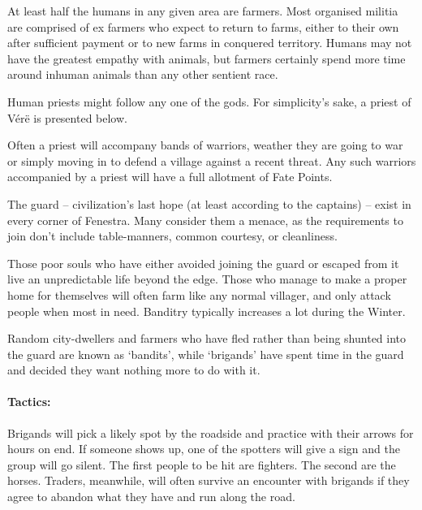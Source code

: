 \begin{multicols}{2}
At least half the humans in any given area are farmers.
Most organised militia are comprised of ex farmers who expect to return to farms, either to their own after sufficient payment or to new farms in conquered territory.
Humans may not have the greatest empathy with animals, but farmers certainly spend more time around inhuman animals than any other sentient race.


\label{human_priest}

Human priests might follow any one of the gods.
For simplicity's sake, a priest of V\'{e}r\"{e} is presented below.


Often a priest will accompany bands of warriors, weather they are going to war or simply moving in to defend a village against a recent threat.
Any such warriors accompanied by a priest will have a full allotment of Fate Points.

\label{human_soldier}

The \gls{guard} -- civilization's last hope (at least according to the captains) -- exist in every corner of Fenestra.
Many consider them a menace, as the requirements to join don't include table-manners, common courtesy, or cleanliness.



Those poor souls who have either avoided joining the \gls{guard} or escaped from it live an unpredictable life beyond the \gls{edge}.
Those who manage to make a proper home for themselves will often farm like any normal villager, and only attack people when most in need.
Banditry typically increases a lot during the Winter.

Random city-dwellers and farmers who have fled rather than being shunted into the \gls{guard} are known as `bandits', while `brigands' have spent time in the \gls{guard} and decided they want nothing more to do with it.

\paragraph{Tactics:}
Brigands will pick a likely spot by the roadside and practice with their arrows for hours on end.
If someone shows up, one of the spotters will give a sign and the group will go silent.
The first people to be hit are fighters.
The second are the horses.
Traders, meanwhile, will often survive an encounter with brigands if they agree to abandon what they have and run along the road.


\end{multicols}
